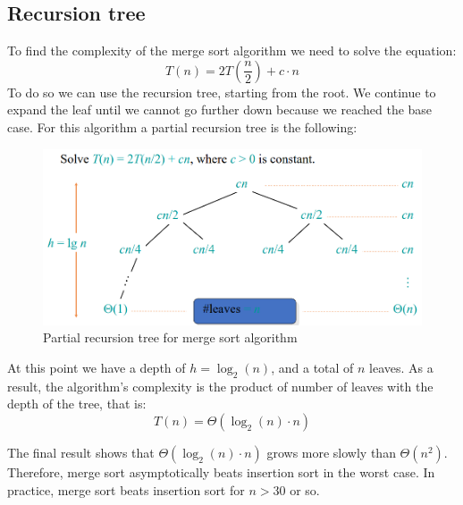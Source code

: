 \subsection{Recursion tree}
To find the complexity of the merge sort algorithm we need to solve the equation: 
\[T(n)=2T\left(\frac{n}{2}\right)+c\cdot n\]
To do so we can use the recursion tree, starting from the root. 
We continue to expand the leaf until we cannot go further down because we reached the base case. 
For this algorithm a partial recursion tree is the following: 
\begin{figure}[H]
    \centering
    \includegraphics[width=0.75\linewidth]{images/tree.png}
    \caption{Partial recursion tree for merge sort algorithm}
\end{figure}

At this point we have a depth of $h=\log_2(n)$, and a total of $n$ leaves. 
As a result, the algorithm's complexity is the product of number of leaves with the depth of the tree, that is: 
\[T(n)=\Theta(\log_2(n)\cdot n)\]

The final result shows that $\Theta(\log_2(n)\cdot n)$ grows more slowly than $\Theta(n^2)$. 
Therefore, merge sort asymptotically beats insertion sort in the worst case.
In practice, merge sort beats insertion sort for $n > 30$ or so.

